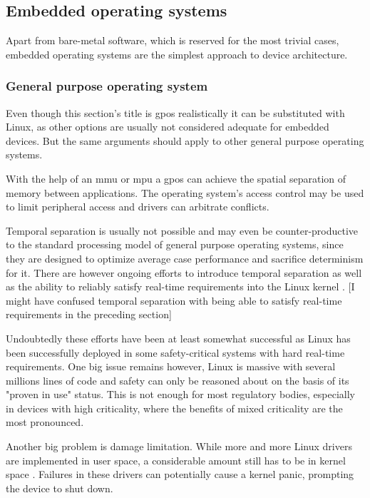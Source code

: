 \subsection{Embedded operating systems}
Apart from bare-metal software, which is reserved for the most trivial cases,  embedded operating systems are the simplest approach to device architecture. 
\subsubsection{General purpose operating system}
Even though this section's title is \acrfull{gpos} realistically it can be substituted with Linux, as other options are usually not considered adequate for embedded devices. But the same arguments should apply to other general purpose operating systems.

With the help of an \acrfull{mmu} or \acrfull{mpu}  a \acrshort{gpos} can achieve the spatial separation of memory between applications. The operating system's access control may be used to limit peripheral access and drivers can arbitrate conflicts. 

Temporal separation is usually not possible and may even be counter-productive to the standard processing model of general purpose operating systems, since they are designed to optimize average case performance and sacrifice determinism for it. There are however ongoing efforts to introduce temporal separation as well as the ability to reliably satisfy real-time requirements into the Linux kernel \cite{SiroArthur.2007}.
[I might have confused temporal separation with being able to satisfy real-time requirements in the preceding section]

Undoubtedly these efforts have been at least somewhat successful as Linux has been successfully deployed in some safety-critical systems with hard real-time requirements. One big issue remains however, Linux is massive with several millions lines of code and safety can only be reasoned about on the basis of its "proven in use" status. This is not enough for most regulatory bodies, especially in devices with high criticality, where the benefits of mixed criticality are the most pronounced.

Another big problem is damage limitation. While more and more Linux drivers are implemented in user space, a considerable amount still has to be in kernel space . Failures in these drivers can potentially cause a kernel panic, prompting the device to shut down. 

